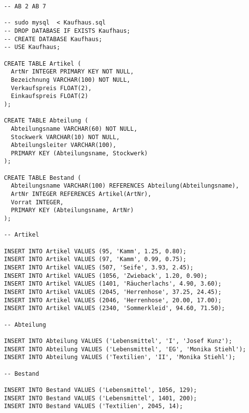\documentclass{lehramt-informatik-aufgabe}
\begin{document}
\begin{verbatim}
-- AB 2 AB 7

-- sudo mysql  < Kaufhaus.sql
-- DROP DATABASE IF EXISTS Kaufhaus;
-- CREATE DATABASE Kaufhaus;
-- USE Kaufhaus;

CREATE TABLE Artikel (
  ArtNr INTEGER PRIMARY KEY NOT NULL,
  Bezeichnung VARCHAR(100) NOT NULL,
  Verkaufspreis FLOAT(2),
  Einkaufspreis FLOAT(2)
);

CREATE TABLE Abteilung (
  Abteilungsname VARCHAR(60) NOT NULL,
  Stockwerk VARCHAR(10) NOT NULL,
  Abteilungsleiter VARCHAR(100),
  PRIMARY KEY (Abteilungsname, Stockwerk)
);

CREATE TABLE Bestand (
  Abteilungsname VARCHAR(100) REFERENCES Abteilung(Abteilungsname),
  ArtNr INTEGER REFERENCES Artikel(ArtNr),
  Vorrat INTEGER,
  PRIMARY KEY (Abteilungsname, ArtNr)
);

-- Artikel

INSERT INTO Artikel VALUES (95, 'Kamm', 1.25, 0.80);
INSERT INTO Artikel VALUES (97, 'Kamm', 0.99, 0.75);
INSERT INTO Artikel VALUES (507, 'Seife', 3.93, 2.45);
INSERT INTO Artikel VALUES (1056, 'Zwieback', 1.20, 0.90);
INSERT INTO Artikel VALUES (1401, 'Räucherlachs', 4.90, 3.60);
INSERT INTO Artikel VALUES (2045, 'Herrenhose', 37.25, 24.45);
INSERT INTO Artikel VALUES (2046, 'Herrenhose', 20.00, 17.00);
INSERT INTO Artikel VALUES (2340, 'Sommerkleid', 94.60, 71.50);

-- Abteilung

INSERT INTO Abteilung VALUES ('Lebensmittel', 'I', 'Josef Kunz');
INSERT INTO Abteilung VALUES ('Lebensmittel', 'EG', 'Monika Stiehl');
INSERT INTO Abteilung VALUES ('Textilien', 'II', 'Monika Stiehl');

-- Bestand

INSERT INTO Bestand VALUES ('Lebensmittel', 1056, 129);
INSERT INTO Bestand VALUES ('Lebensmittel', 1401, 200);
INSERT INTO Bestand VALUES ('Textilien', 2045, 14);
\end{verbatim}
\end{document}
